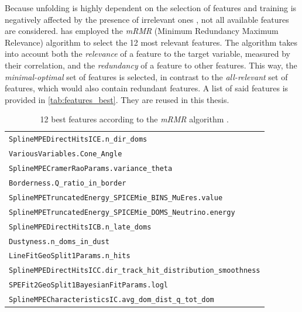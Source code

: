 Because
  unfolding is highly dependent on the selection of features \cite{dsea_jan} %
  and training is negatively affected by the presence of irrelevant ones \cite{dash1997},
not all available features are considered.
%
\citeauthor{dsea_jan} \cite{dsea_jan} has employed the \emph{mRMR} (Minimum Redundancy Maximum Relevance) algorithm \cite{mrmr}
to select the 12 most relevant features.
The algorithm takes into account both
  the \emph{relevance} of a feature to the target variable,
    measured by their correlation,
  and the \emph{redundancy} of a feature to other features.
This way,
the \emph{minimal-optimal} set of features is selected,
  in contrast to the \emph{all-relevant} set of features,
    which would also contain redundant features.
A list of said features is provided in \autoref{tab:features_best}.
They are reused in this thesis.

\begin{table}
  \centering
  \begin{tabular}{l}
    \toprule
    \texttt{SplineMPEDirectHitsICE.n\_dir\_doms} \\
    \texttt{VariousVariables.Cone\_Angle} \\
    \texttt{SplineMPECramerRaoParams.variance\_theta} \\
    \texttt{Borderness.Q\_ratio\_in\_border} \\
    \texttt{SplineMPETruncatedEnergy\_SPICEMie\_BINS\_MuEres.value} \\
    \texttt{SplineMPETruncatedEnergy\_SPICEMie\_DOMS\_Neutrino.energy} \\
    \texttt{SplineMPEDirectHitsICB.n\_late\_doms} \\
    \texttt{Dustyness.n\_doms\_in\_dust} \\
    \texttt{LineFitGeoSplit1Params.n\_hits} \\
    \texttt{SplineMPEDirectHitsICC.dir\_track\_hit\_distribution\_smoothness} \\
    \texttt{SPEFit2GeoSplit1BayesianFitParams.logl} \\
    \texttt{SplineMPECharacteristicsIC.avg\_dom\_dist\_q\_tot\_dom} \\
    \bottomrule
  \end{tabular}
  \caption{
    12 best features according to the \emph{mRMR} algorithm \cite{dsea_jan}.
  }
  \label{tab:features_best}
\end{table}


